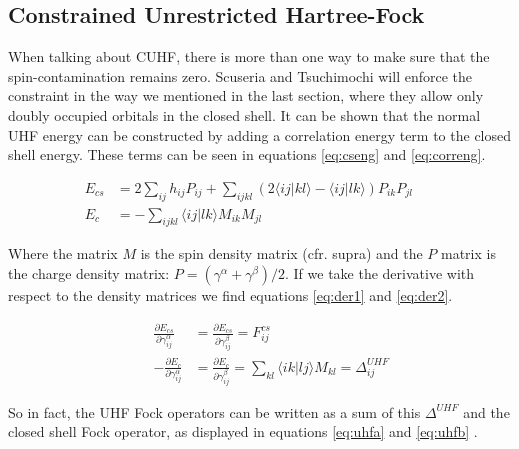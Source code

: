 \documentclass[twoside,twocolumn,9pt]{article}
\begin{document}
\subsection{Constrained Unrestricted Hartree-Fock}
\label{subsec:cuhftheory}
When talking about CUHF, there is more than one way to make sure that the spin-contamination remains zero. Scuseria and Tsuchimochi will enforce the constraint in the way
we mentioned in the last section, where they allow only doubly occupied orbitals in the closed shell\cite{Scuseria2010}. It can be shown that the normal UHF energy can be
constructed by adding a correlation energy term to the closed shell energy. These terms can be seen in equations \eqref{eq:cseng} and \eqref{eq:correng}\cite{Savin2010}.

\begin{subequations}
  \begin{align}
    \label{eq:cseng}
    E_{cs} & = 2\sum_{ij}h_{ij}P_{ij} + \sum_{ijkl}(2\langle ij|kl\rangle - \langle ij|lk \rangle)P_{ik}P_{jl} &  & \\
    \label{eq:correng}
    E_c    & = -\sum_{ijkl}\langle ij|lk \rangle M_{ik}M_{jl}                                                  &  &
  \end{align}
\end{subequations}

Where the matrix $M$ is the spin density matrix (cfr. supra) and the $P$ matrix is the charge density matrix: $P = (\gamma^\alpha + \gamma^\beta)/2$. If we take the
derivative with respect to the density matrices we find equations \eqref{eq:der1} and \eqref{eq:der2}.

\begin{subequations}
  \begin{align}
    \label{eq:der1}
     &  & \frac{\partial E_{cs}}{\partial \gamma^\alpha_{ij}} & = \frac{\partial E_{cs}}{\partial \gamma^\beta_{ij}} = F^{cs}_{ij}                                             \\
    \label{eq:der2}
     &  & -\frac{\partial E_c}{\partial \gamma^\alpha_{ij}}   & = \frac{\partial E_c}{\partial \gamma^\beta_{ij}} = \sum_{kl} \langle ik|lj \rangle M_{kl} = \Delta^{UHF}_{ij}
  \end{align}
\end{subequations}

So in fact, the UHF Fock operators can be written as a sum of this $\Delta^{UHF}$ and the closed shell Fock operator, as displayed in equations \eqref{eq:uhfa} and \eqref{eq:uhfb}
\cite{Scuseria2010}.
\end{document}
